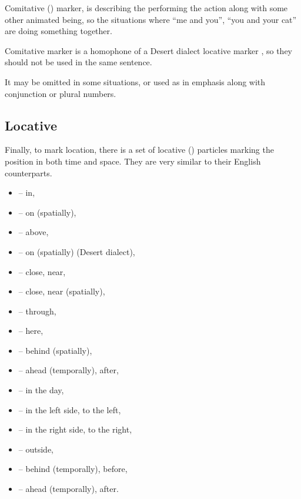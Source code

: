 Comitative (\Com{}) marker,  is describing the performing the action
along with some other animated being, so the situations where ``me and you'',
``you and your cat'' are doing something together.


Comitative marker is a homophone of a Desert dialect locative marker ,
so they should not be used in the same sentence.

It may be omitted in some situations, or used as in emphasis along with
conjunction or plural numbers.




\subsection{Locative}

Finally, to mark location, there is a set of locative (\Loc{}) particles marking
the position in both time and space. They are very similar to their English
counterparts.

\begin{itemize}
    \item {} -- in,
    \item {} -- on (spatially),
    \item {} -- above,
    \item {} -- on (spatially) (Desert dialect),
    \item {} -- close, near,
    \item {} -- close, near (spatially),
    \item {} -- through,
    \item {} -- here,
    \item {} -- behind (spatially),
    \item {} -- ahead (temporally), after,
    \item {} -- in the day,
    \item {} -- in the left side, to the left,
    \item {} -- in the right side, to the right,
    \item {} -- outside,
    \item {} -- behind (temporally), before,
    \item {} -- ahead (temporally), after.
\end{itemize}

